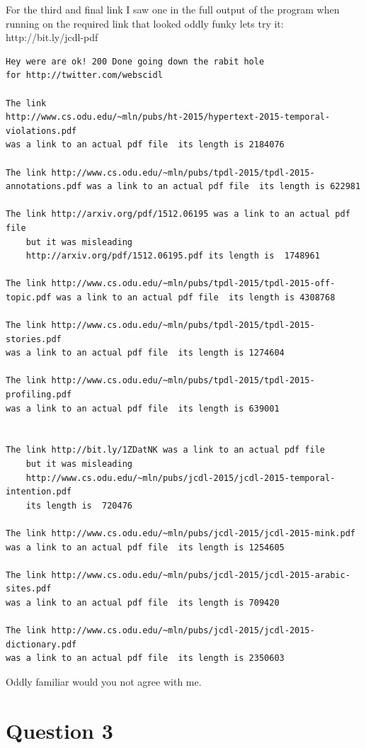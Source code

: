 \documentclass[letterpaper,10pt]{article}
\begin{document}
\noindent
\newline
For the third and final link I saw one in the full output of the program when running on the required link that looked oddly funky lets try it: http://bit.ly/jcdl-pdf

\begin{verbatim}
Hey were are ok! 200 Done going down the rabit hole 
for http://twitter.com/webscidl

The link 
http://www.cs.odu.edu/~mln/pubs/ht-2015/hypertext-2015-temporal-violations.pdf 
was a link to an actual pdf file  its length is 2184076

The link http://www.cs.odu.edu/~mln/pubs/tpdl-2015/tpdl-2015-annotations.pdf was a link to an actual pdf file  its length is 622981

The link http://arxiv.org/pdf/1512.06195 was a link to an actual pdf file  
	but it was misleading 
	http://arxiv.org/pdf/1512.06195.pdf its length is  1748961

The link http://www.cs.odu.edu/~mln/pubs/tpdl-2015/tpdl-2015-off-topic.pdf was a link to an actual pdf file  its length is 4308768

The link http://www.cs.odu.edu/~mln/pubs/tpdl-2015/tpdl-2015-stories.pdf 
was a link to an actual pdf file  its length is 1274604

The link http://www.cs.odu.edu/~mln/pubs/tpdl-2015/tpdl-2015-profiling.pdf 
was a link to an actual pdf file  its length is 639001


The link http://bit.ly/1ZDatNK was a link to an actual pdf file  
	but it was misleading 
	http://www.cs.odu.edu/~mln/pubs/jcdl-2015/jcdl-2015-temporal-intention.pdf 
	its length is  720476

The link http://www.cs.odu.edu/~mln/pubs/jcdl-2015/jcdl-2015-mink.pdf 
was a link to an actual pdf file  its length is 1254605

The link http://www.cs.odu.edu/~mln/pubs/jcdl-2015/jcdl-2015-arabic-sites.pdf 
was a link to an actual pdf file  its length is 709420

The link http://www.cs.odu.edu/~mln/pubs/jcdl-2015/jcdl-2015-dictionary.pdf 
was a link to an actual pdf file  its length is 2350603

\end{verbatim}

Oddly familiar would you not agree with me. 
\newpage
\section*{Question 3}
\end{document}
